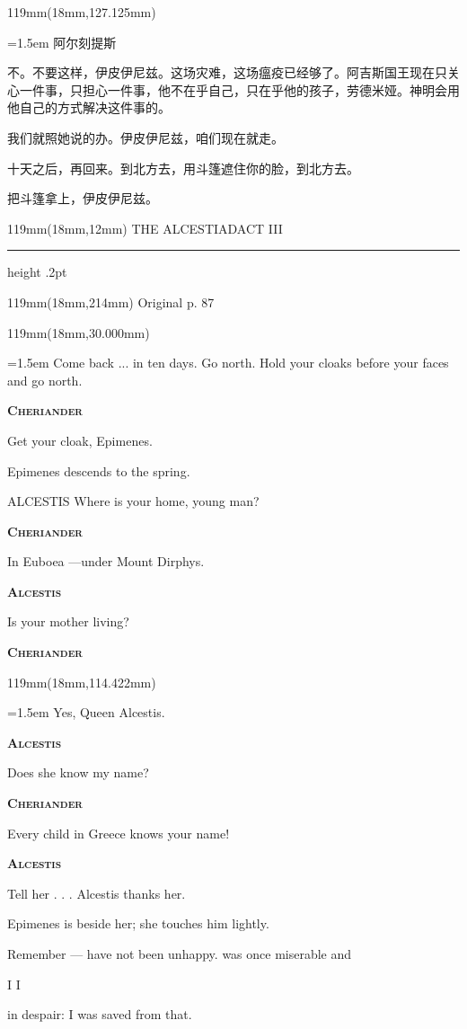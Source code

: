 \documentclass{article}
\newcommand{\ENsetup}{\normalfont\color{ink}\fontsize{11}{16.5}\selectfont\emergencystretch=1.5em}
\newcommand{\ZHsetup}{\normalfont\color{ink}\fontsize{10.5}{17}\selectfont\emergencystretch=1.5em}
\newcommand{\ENspeaker}[1]{{\fontsize{9.8}{13}\selectfont\scshape\bfseries #1}\par\vspace{3pt}}
\newcommand{\ZHspeaker}[1]{{\hei\fontsize{10.3}{13}\selectfont #1}\par\vspace{3pt}}
\newcommand{\Block}[3]{\begin{textblock*}{119mm}(18mm,#1mm){#2 #3\par}\end{textblock*}}
\newcommand{\Heading}[3]{%
  \begin{textblock*}{119mm}(18mm,12mm)
    \color{quiet}\fontsize{7.5}{10}\selectfont
    #1\hfill #2\par\vspace{3mm}\hrule height .2pt
  \end{textblock*}
  \begin{textblock*}{119mm}(18mm,214mm)
    \color{quiet}\fontsize{7}{10}\selectfont #3\hfill\thepage
  \end{textblock*}
}
\begin{document}
\Block{127.125}{\ZHsetup}{\ZHspeaker{阿尔刻提斯}不。不要这样，伊皮伊尼兹。这场灾难，这场瘟疫已经够了。阿吉斯国王现在只关心一件事，只担心一件事，他不在乎自己，只在乎他的孩子，劳德米娅。神明会用他自己的方式解决这件事的。\par \vspace{2.2mm}\ZHspeaker{切瑞安德}我们就照她说的办。伊皮伊尼兹，咱们现在就走。\par \vspace{2.2mm}\ZHspeaker{阿尔刻提斯}十天之后，再回来。到北方去，用斗篷遮住你的脸，到北方去。\par \vspace{2.2mm}\ZHspeaker{切瑞安德}把斗篷拿上，伊皮伊尼兹。\par }
\newpage
\null
\Heading{THE ALCESTIAD}{ACT III}{Original p. 87}
\Block{30.000}{\ENsetup}{\sloppy
Come back ... in ten days. Go north. Hold your cloaks before your faces and go north.\par\vspace{2pt}
\ENspeaker{Cheriander}
Get your cloak, Epimenes.\par\vspace{2pt}
Epimenes descends to the spring.\par\vspace{2pt}
ALCESTIS Where is your home, young man?\par\vspace{2pt}
\ENspeaker{Cheriander}
In Euboea —under Mount Dirphys.\par\vspace{2pt}
\ENspeaker{Alcestis}
Is your mother living?\par\vspace{2pt}
\ENspeaker{Cheriander}}
\Block{114.422}{\ENsetup}{\sloppy
Yes, Queen Alcestis.\par\vspace{2pt}
\ENspeaker{Alcestis}
Does she know my name?\par\vspace{2pt}
\ENspeaker{Cheriander}
Every child in Greece knows your name!\par\vspace{2pt}
\ENspeaker{Alcestis}
Tell her . . . Alcestis thanks her.\par\vspace{2pt}
Epimenes is beside her; she touches him lightly.\par\vspace{2pt}
Remember — have not been unhappy. was once miserable and\par\vspace{2pt}
I I\par\vspace{2pt}
in despair: I was saved from that.\par\vspace{2pt}}
\end{document}
